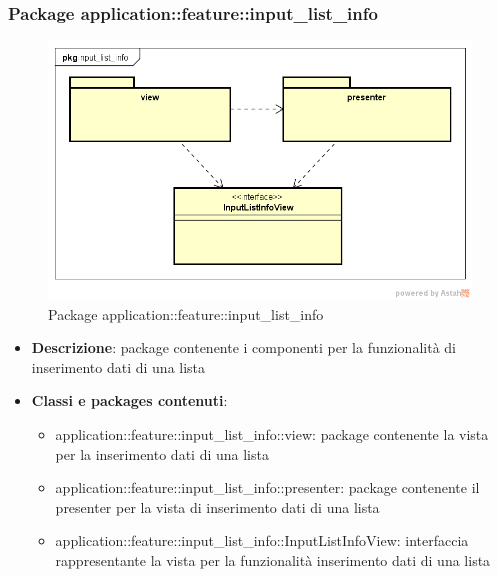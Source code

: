 \subsubsection{Package application::feature::input\_list\_info}
\label{Package application::feature::input_list_info}
\begin{figure}[H]
	\centering
	\includegraphics[scale=0.5]{Sezioni/Packages/Application/input_list_info.png}
	\caption{Package application::feature::input\_list\_info}
\end{figure}
\begin{itemize}
	\item \textbf{Descrizione}: package contenente i componenti per la funzionalità di inserimento dati di una lista
	\item \textbf{Classi e packages contenuti}:
	\begin{itemize}
	\item application::feature::input\_list\_info::view: package contenente la vista per la inserimento dati di una lista
	\item application::feature::input\_list\_info::presenter: package contenente il presenter per la vista di inserimento dati di una lista
	\item application::feature::input\_list\_info::InputListInfoView: interfaccia rappresentante la vista per la funzionalità inserimento dati di una lista
	\end{itemize}
\end{itemize}

